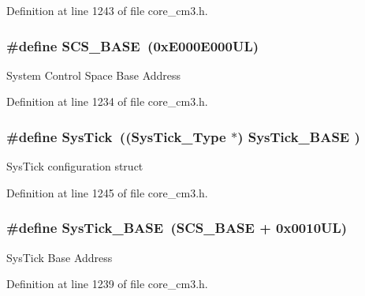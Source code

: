 Definition at line 1243 of file core\+\_\+cm3.\+h.

\subsubsection[{\texorpdfstring{S\+C\+S\+\_\+\+B\+A\+SE}{SCS_BASE}}]{\setlength{\rightskip}{0pt plus 5cm}\#define S\+C\+S\+\_\+\+B\+A\+SE~(0x\+E000\+E000\+U\+L)}\hypertarget{group__CMSIS__core__base_ga3c14ed93192c8d9143322bbf77ebf770}{}\label{group__CMSIS__core__base_ga3c14ed93192c8d9143322bbf77ebf770}
System Control Space Base Address 

Definition at line 1234 of file core\+\_\+cm3.\+h.

\subsubsection[{\texorpdfstring{Sys\+Tick}{SysTick}}]{\setlength{\rightskip}{0pt plus 5cm}\#define Sys\+Tick~(({\bf Sys\+Tick\+\_\+\+Type}   $\ast$)     {\bf Sys\+Tick\+\_\+\+B\+A\+SE}  )}\hypertarget{group__CMSIS__core__base_gacd96c53beeaff8f603fcda425eb295de}{}\label{group__CMSIS__core__base_gacd96c53beeaff8f603fcda425eb295de}
Sys\+Tick configuration struct 

Definition at line 1245 of file core\+\_\+cm3.\+h.

\subsubsection[{\texorpdfstring{Sys\+Tick\+\_\+\+B\+A\+SE}{SysTick_BASE}}]{\setlength{\rightskip}{0pt plus 5cm}\#define Sys\+Tick\+\_\+\+B\+A\+SE~({\bf S\+C\+S\+\_\+\+B\+A\+SE} +  0x0010\+U\+L)}\hypertarget{group__CMSIS__core__base_ga58effaac0b93006b756d33209e814646}{}\label{group__CMSIS__core__base_ga58effaac0b93006b756d33209e814646}
Sys\+Tick Base Address 

Definition at line 1239 of file core\+\_\+cm3.\+h.

